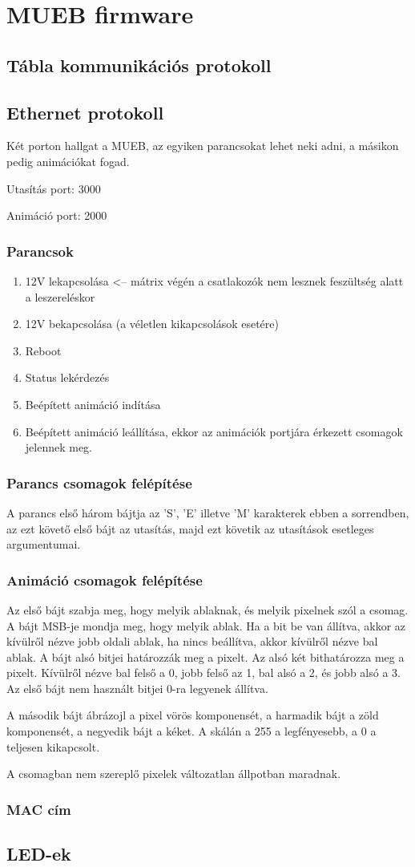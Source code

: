 \chapter{MUEB firmware}

\section{Tábla kommunikációs protokoll}
\section{Ethernet protokoll}
Két porton hallgat a MUEB, az egyiken parancsokat lehet neki adni, a másikon pedig animációkat fogad.
\par
Utasítás port: 3000
\par
Animáció port: 2000

\subsection{Parancsok}
\begin{enumerate}
  \item 12V lekapcsolása <-- mátrix végén a csatlakozók nem lesznek feszültség alatt a leszereléskor
  \item 12V bekapcsolása (a véletlen kikapcsolások esetére)
  \item Reboot
  \item Status lekérdezés
  \item Beépített animáció indítása
  \item Beépített animáció leállítása, ekkor az animációk portjára érkezett csomagok jelennek meg.
\end{enumerate}
\subsection{Parancs csomagok felépítése}
A parancs első három bájtja az 'S', 'E' illetve 'M' karakterek ebben a sorrendben, az ezt követő első bájt az utasítás, majd ezt követik az utasítások esetleges argumentumai. 
\subsection{Animáció csomagok felépítése}
Az első bájt szabja meg, hogy melyik ablaknak, és melyik pixelnek szól a csomag. A bájt MSB-je mondja meg, hogy melyik ablak. Ha a bit be van állítva, akkor az kívülről nézve jobb oldali ablak, ha nincs beállítva, akkor kívülről nézve bal ablak. A bájt alsó bitjei határozzák meg a pixelt. Az alsó két bithatározza meg a pixelt. Kívülről nézve bal felső a 0, jobb felső az 1, bal alsó a 2, és jobb alsó a 3. Az első bájt nem használt bitjei 0-ra legyenek állítva. 
\par
A második bájt ábrázojl a pixel vörös komponensét, a harmadik bájt a zöld komponensét, a negyedik bájt a kéket. A skálán a 255 a legfényesebb, a 0 a teljesen kikapcsolt.
\par
A csomagban nem szereplő pixelek változatlan állpotban maradnak.
\subsection{MAC cím}
\section{LED-ek}
